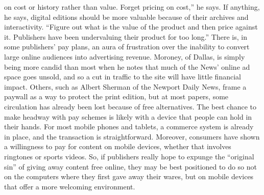 on cost or history rather than value. Forget pricing on cost,'' he says. If anything,
he says, digital editions should be more valuable because of their archives and
interactivity. ``Figure out what is the value of the product and then price against
it. Publishers have been undervaluing their product for too long.''
There is, in some publishers' pay plans, an aura of frustration over the inability
to convert large online audiences into advertising revenue. Moroney, of Dallas,
is simply being more candid than most when he notes that much of the News'
online ad space goes unsold, and so a cut in traffic to the site will have little financial
impact. Others, such as Albert Sherman of the Newport Daily News, frame a
paywall as a way to protect the print edition, but at most papers, some circulation
has already been lost because of free alternatives.
The best chance to make headway with pay schemes is likely with a device that
people can hold in their hands. For most mobile phones and tablets, a commerce
system is already in place, and the transaction is straightforward. Moreover, consumers
have shown a willingness to pay for content on mobile devices, whether
that involves ringtones or sports videos. So, if publishers really hope to expunge
the ``original sin'' of giving away content free online, they may be best positioned
to do so not on the computers where they first gave away their wares, but on
mobile devices that offer a more welcoming environment.


